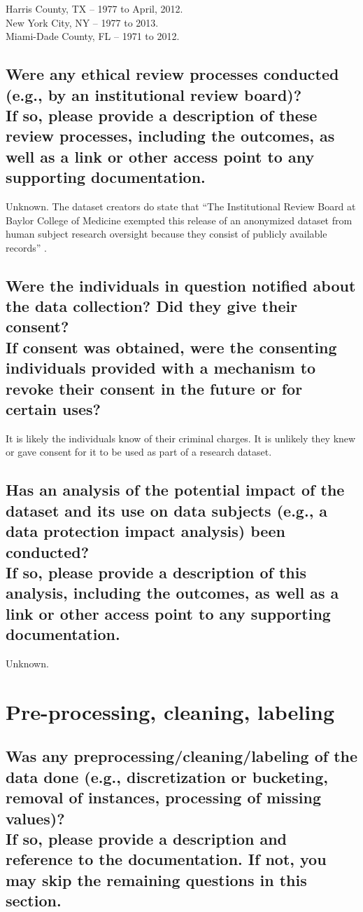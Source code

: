 \documentclass[letterpaper, 10 pt, conference]{ieeeconf}  %
\newcommand{\subtitle}[1]{{\\ \small \normalfont \color{purple} #1}}
\begin{document}
Harris County, TX -- 1977 to April, 2012. \\
New York City, NY -- 1977 to 2013. \\
Miami-Dade County, FL -- 1971 to 2012. \\

\subsection{Were any ethical review processes conducted (e.g., by an institutional review board)? \subtitle{If so, please provide a description of these review processes, including the outcomes, as well as a link or other access point to any supporting documentation.}}


Unknown. The dataset creators do state that ``The Institutional Review
Board at Baylor College of Medicine exempted this release of an anonymized dataset from human subject research oversight because they consist of publicly available records'' \cite{ormachea2015new}.

\subsection{Were the individuals in question notified about the data collection? Did they give their consent? \subtitle{If consent was obtained, were the consenting individuals provided with a mechanism to revoke their consent in the future or for certain uses?}}

It is likely the individuals know of their criminal charges. It is unlikely they knew or gave consent for it to be used as part of a research dataset. 

\subsection{Has an analysis of the potential impact of the dataset and its use on data subjects (e.g., a data protection impact analysis) been conducted? \subtitle{If so, please provide a description of this analysis, including the outcomes, as well as a link or other access point to any supporting documentation.}}

Unknown. 

\section{Pre-processing, cleaning, labeling}

\subsection{Was any preprocessing/cleaning/labeling of the data done (e.g., discretization or bucketing, removal of instances, processing of missing values)? \subtitle{If so, please provide a description and reference to the documentation. If not, you may skip the remaining questions in this section.}}
\end{document}
